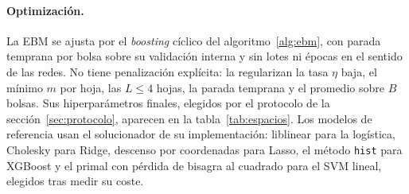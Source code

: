 \paragraph{Optimización.}
La EBM se ajusta por el \emph{boosting} cíclico del algoritmo~\ref{alg:ebm}, con parada temprana por bolsa
sobre su validación interna y sin lotes ni épocas en el sentido de las redes. No tiene penalización explícita:
la regularizan la tasa $\eta$ baja, el mínimo $m$ por hoja, las $L \leq 4$ hojas, la parada temprana y el
promedio sobre $B$ bolsas. Sus hiperparámetros finales, elegidos por el protocolo de la
sección~\ref{sec:protocolo}, aparecen en la tabla~\ref{tab:espacios}. Los
modelos de referencia usan el solucionador de su implementación: liblinear para la logística, Cholesky para
Ridge, descenso por coordenadas para Lasso, el método \texttt{hist} para XGBoost y el primal con pérdida de
bisagra al cuadrado para el SVM lineal, elegidos tras medir su coste.

